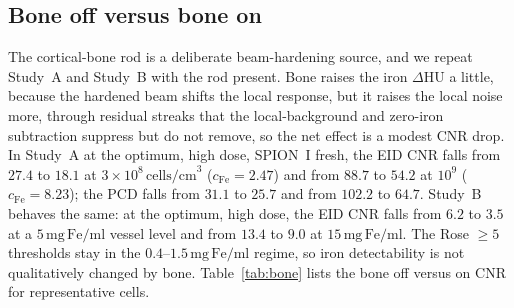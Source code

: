 \documentclass[]{spie}  %
\begin{document}
\begin{table}[ht]
\caption{Study~A loading $\times$ cell-density grid. Measured cellular loading
(Heinen et al., Fig.~5; $0\,\mathrm{h}$ / $24\,\mathrm{h}$) converted to tumor iron
concentration $c_{\mathrm{Fe}}$ [mg~Fe/ml] via cell density $\rho$.}
\label{tab:grid}
\begin{center}

\end{center}
\end{table}

\begin{table}[ht]
\caption{Detection thresholds -- the lowest $c_{\mathrm{Fe}}$ [mg~Fe/ml] reaching
the Rose $\mathrm{CNR}\ge5$ criterion (bone off) -- per detector, cell density, dose,
and spectrum. A dash means the criterion is not reached within the swept range.}
\label{tab:thresh}
\begin{center}

\end{center}
\end{table}

\subsection{Bone off versus bone on}
\label{sec:res-bone}
The cortical-bone rod is a deliberate beam-hardening source, and we repeat Study~A and
Study~B with the rod present. Bone raises the iron $\Delta$HU a little, because the
hardened beam shifts the local response, but it raises the local noise more, through
residual streaks that the local-background and zero-iron subtraction suppress but do
not remove, so the net effect is a modest CNR drop. In Study~A at the optimum, high
dose, SPION~I fresh, the EID CNR falls from $27.4$ to $18.1$ at
$3{\times}10^{8}\,\mathrm{cells/cm}^3$ ($c_{\mathrm{Fe}}=2.47$) and from $88.7$ to
$54.2$ at $10^{9}$ ($c_{\mathrm{Fe}}=8.23$); the PCD falls from $31.1$ to $25.7$ and
from $102.2$ to $64.7$. Study~B behaves the same: at the optimum, high dose, the EID
CNR falls from $6.2$ to $3.5$ at a $5\,\mathrm{mg\,Fe/ml}$ vessel level and from
$13.4$ to $9.0$ at $15\,\mathrm{mg\,Fe/ml}$. The Rose $\ge5$ thresholds stay in the
$0.4$--$1.5\,\mathrm{mg\,Fe/ml}$ regime, so iron detectability is not qualitatively
changed by bone. Table~\ref{tab:bone} lists the bone off versus on CNR for
representative cells.

\begin{table}[ht]
\caption{Bone off versus bone on. Iron CNR at matched load, for representative
Study~A and Study~B cells at the E2 optimum, high dose. Bone raises $\Delta$HU
slightly via beam hardening but raises local noise more, so CNR drops; the
detection thresholds stay in the $0.4$--$1.5\,\mathrm{mg\,Fe/ml}$ regime.}
\label{tab:bone}
\begin{center}

\end{center}
\end{table}
\end{document}

